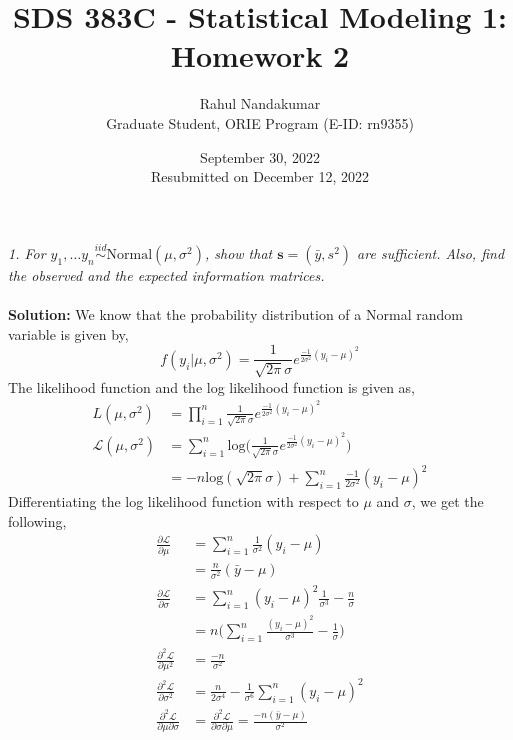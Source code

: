 \documentclass[11pt]{article}
\title{SDS 383C - Statistical Modeling 1: Homework 2}
\author{Rahul Nandakumar \\ Graduate Student, ORIE Program (E-ID: rn9355)}
\date{September 30, 2022\\ Resubmitted on December 12, 2022}
\begin{document}
\maketitle
\noindent \emph{1. For $y_{1}, \dots y_{n} \overset{iid}{\sim} \text{Normal}(\mu, \sigma^{2})$, show that $\mathbf{s} = (\bar{y}, s^{2})$ are sufficient. Also, find the observed and the expected information matrices.}\\ \\
\textbf{Solution:} We know that the probability distribution of a Normal random variable is given by,
\begin{equation}
  \nonumber
  f(y_{i} | \mu, \sigma^{2}) = \frac{1}{\sqrt{2\pi}\sigma}e^{\frac{-1}{2\sigma^{2}} (y_{i} - \mu)^{2}}
\end{equation}
The likelihood function and the log likelihood function is given as,
\begin{equation}
  \nonumber
  \begin{aligned}
    L(\mu, \sigma^{2}) & = \prod_{i = 1}^{n}\frac{1}{\sqrt{2\pi}\sigma}e^{\frac{-1}{2\sigma^{2}} (y_{i} - \mu)^{2}}\\
    \mathcal{L}(\mu, \sigma^{2}) & = \sum_{i = 1}^{n} \text{log}\bigg(\frac{1}{\sqrt{2\pi}\sigma}e^{\frac{-1}{2\sigma^{2}} (y_{i} - \mu)^{2}}\bigg)\\
    & = -n \text{log}(\sqrt{2\pi} \sigma) + \sum_{i = 1}^{n} \frac{-1}{2\sigma^{2}}(y_{i} - \mu)^{2}
  \end{aligned}
\end{equation}
Differentiating the log likelihood function with respect to $\mu$ and $\sigma$, we get the following,
\begin{equation}
  \nonumber
  \begin{aligned}
    \frac{\partial \mathcal{L}}{\partial \mu} & = \sum_{i = 1}^{n}\frac{1}{\sigma^{2}}(y_{i} - \mu)\\
    & = \frac{n}{\sigma^{2}}(\bar{y} - \mu)\\
    \frac{\partial \mathcal{L}}{\partial \sigma} & = \sum_{i = 1}^{n}(y_{i} - \mu)^{2}\frac{1}{\sigma^{3}} - \frac{n}{\sigma}\\
    & = n\bigg(\sum_{i = 1}^{n}\frac{(y_{i} - \mu)^{2}}{\sigma^{3}} - \frac{1}{\sigma}\bigg)\\
    \frac{\partial^{2} \mathcal{L}}{\partial \mu^{2}}& = \frac{-n}{\sigma^{2}}\\
    \frac{\partial^{2} \mathcal{L}}{\partial \sigma^{2}} & = \frac{n}{2\sigma^{4}} - \frac{1}{\sigma^{6}}\sum_{i = 1}^{n}(y_{i} - \mu)^{2}\\
    \frac{\partial^{2} \mathcal{L}}{\partial \mu \partial \sigma} & = \frac{\partial^{2} \mathcal{L}}{\partial \sigma \partial \mu} = \frac{-n(\bar{y} - \mu)}{\sigma^{2}}
  \end{aligned}
\end{equation}
\end{document}
